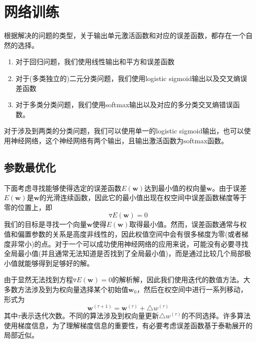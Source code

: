 \section{网络训练}
根据解决的问题的类型，关于输出单元激活函数和对应的误差函数，都存在一个自然的选择。
\begin{enumerate}
	\item 对于回归问题，我们使用线性输出和平方和误差函数
	\item 对于(多类独立的)二元分类问题，我们使用logistic sigmoid输出以及交叉熵误差函数
	\item 对于多类分类问题，我们使用softmax输出以及对应的多分类交叉熵错误函数。
\end{enumerate}
对于涉及到两类的分类问题，我们可以使用单一的logistic sigmoid输出，也可以使用神经网络，这个神经网络有两个输出，且输出激活函数为softmax函数。
\subsection*{参数最优化}
下面考虑寻找能够使得选定的误差函数$E(\boldsymbol{w})$达到最小值的权向量$\boldsymbol{w}$。由于误差$E(\boldsymbol{w})$是$\boldsymbol{w}$的光滑连续函数，因此它的最小值出现在权空间中误差函数梯度等于零的位置上，即
\begin{equation}
	\triangledown E(\boldsymbol{w})=0
\end{equation}
我们的目标是寻找一个向量$\boldsymbol{w}$使得$E(\boldsymbol{w})$取得最小值。然而，误差函数通常与权值和偏置参数的关系是高度非线性的，因此权值空间中会有很多梯度为零(或者梯度非常小)的点。对于一个可以成功使用神经网络的应用来说，可能没有必要寻找全局最小值(并且通常无法知道是否找到了全局最小值)，而是通过比较几个局部极小值就能够得到足够好的解。

由于显然无法找到方程$\triangledown E(\boldsymbol{w})=0$的解析解，因此我们使用迭代的数值方法。大多数方法涉及到为权向量选择某个初始值$\boldsymbol{w}_0$，然后在权空间中进行一系列移动，形式为
\begin{equation}
	\boldsymbol{w}^{(\tau +1)}=\boldsymbol{w}^{(\tau)}+\triangle w^{(\tau)}
\end{equation}
其中$\tau$表示迭代次数。不同的算法涉及到权向量更新$\triangle w^{(\tau)}$的不同选择。许多算法使用梯度信息，为了理解梯度信息的重要性，有必要考虑误差函数基于泰勒展开的局部近似。
